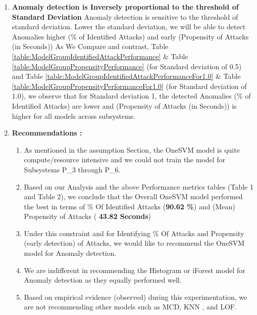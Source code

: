 \documentclass{article}
\begin{document}
\begin{enumerate}
\begin{enumerate}
     
        \end{enumerate}
        
        
        \item \textbf{Anomaly detection is Inversely proportional to the threshold of Standard Deviation } Anomaly detection is sensitive to the threshold of standard deviation. Lower the standard deviation, we will be able to detect Anomalies higher (\% of Identified Attacks) and early (Propensity of Attacks (in Seconds)) As We Compare and contrast, Table \ref{table:ModelGroupIdentifiedAttackPerformance} \& Table \ref{table:ModelGroupPropensityPerformance} (for Standard deviation of 0.5) and Table \ref{table:ModelGroupIdentifiedAttackPerformanceFor1.0} \& Table \ref{table:ModelGroupPropensityPerformanceFor1.0} (for Standard deviation of 1.0), we observe that for Standard deviation 1, the detected Anomalies (\% of Identified Attacks) are lower and (Propensity of Attacks (in Seconds)) is higher for all models across subsystems. 

        \item \textbf{Recommendations :}
        \begin{enumerate}
            \item As mentioned in the assumption Section, the OneSVM model is quite compute/resource intensive and we could not train the model for Subsystems P\_3 through P\_6. 

            \item Based on our Analysis and the above Performance metrics tables (Table 1 and Table 2), we conclude that the Overall OneSVM model performed the best in terms of \% Of Identified Attacks (\textbf{90.62 \%}) and (Mean) Propensity of Attacks (\textbf{ 43.82 Seconds})

        
            \item Under this constraint and for Identifying \% Of Attacks and Propensity (early detection) of Attacks, we would like to recommend the OneSVM model for Anomaly detection.
    
            \item We are indifferent in recommending the Histogram or iForest model for Anomaly detection as they equally performed well.
    
            \item Based on empirical evidence (observed) during this experimentation, we are not recommending other models such as MCD, KNN , and LOF.
     
        \end{enumerate}
    \end{enumerate}
\end{document}
